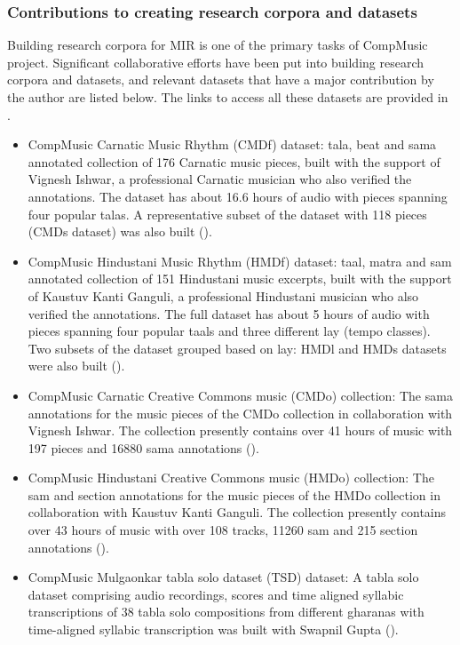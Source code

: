 \subsubsection{Contributions to creating research corpora and datasets}
Building research corpora for \gls{MIR} is one of the primary tasks of CompMusic project. Significant collaborative efforts have been put into building research corpora and datasets, and relevant datasets that have a major contribution by the author are listed below. The links to access all these datasets are provided in . 
\begin{itemize}[leftmargin=*]
	\item CompMusic Carnatic Music Rhythm (\acrshort{CMDf}) dataset: \Gls{tala}, beat and \gls{sama} annotated collection of 176 Carnatic music pieces, built with the support of Vignesh Ishwar, a professional Carnatic musician who also verified the annotations. The dataset has about 16.6 hours of audio with pieces spanning four popular \glspl{tala}. A representative subset of the dataset with 118 pieces (\acrshort{CMDs} dataset) was also built ().
	\item CompMusic Hindustani Music Rhythm (\acrshort{HMDf}) dataset: \Gls{taal}, \gls{matra} and \gls{sam} annotated collection of 151 Hindustani music excerpts, built with the support of Kaustuv Kanti Ganguli, a professional Hindustani musician who also verified the annotations. The full dataset has about 5 hours of audio with pieces spanning four popular \glspl{taal} and three different \gls{lay} (tempo classes). Two subsets of the dataset grouped based on \gls{lay}: \acrshort{HMDl} and \acrshort{HMDs} datasets were also built (). 
	\item CompMusic Carnatic Creative Commons music (\acrshort{CMDo}) collection: The \gls{sama} annotations for the music pieces of the \acrshort{CMDo} collection in collaboration with Vignesh Ishwar. The collection presently contains over 41 hours of music with 197 pieces and 16880 \gls{sama} annotations ().  
	\item CompMusic Hindustani Creative Commons music (\acrshort{HMDo}) collection: The \gls{sam} and section annotations for the music pieces of the \acrshort{HMDo} collection in collaboration with Kaustuv Kanti Ganguli. The collection presently contains over 43 hours of music with over 108 tracks, 11260 \gls{sam} and 215 section annotations (). 
	\item CompMusic Mulgaonkar \gls{tabla} solo dataset (\acrshort{TSD}) dataset: A \gls{tabla} solo dataset comprising audio recordings, scores and time aligned syllabic transcriptions of 38 \gls{tabla} solo compositions from different \glspl{gharana} with time-aligned syllabic transcription was built with Swapnil Gupta (). 

\end{itemize}
